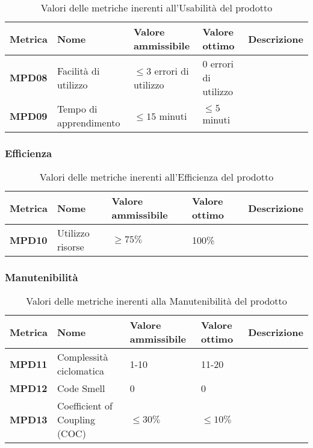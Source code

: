 \documentclass[italian,12pt]{article} %
\begin{document}
\begin{table}[h!]
	\centering
	\begin{tabularx}{\textwidth}{|X|X|X|X|X|} 	 
		\hline
		\textbf{Metrica} 	& \textbf{Nome} & \textbf{Valore ammissibile} & \textbf{Valore ottimo} & \textbf{Descrizione}\\  	 
		\hline
		\textbf{MPD08} & Facilità di utilizzo & $\leq 3 $ errori di utilizzo & 0 errori di utilizzo &\\
		\hline
		\textbf{MPD09} & Tempo di apprendimento & $\leq 15 $ minuti  & $\leq 5 $ minuti & \\ 
		\hline
	\end{tabularx}
	\caption{ Valori delle metriche inerenti all'Usabilità del prodotto}
	\label{table:9}
	\end{table}

\subsubsection{Efficienza}

\begin{table}[h!]
	\centering
	\begin{tabularx}{\textwidth}{|X|X|X|X|X|} 	 
		\hline
		\textbf{Metrica} 	& \textbf{Nome} & \textbf{Valore ammissibile} & \textbf{Valore ottimo} & \textbf{Descrizione}\\  	 
		\hline
		\textbf{MPD10} & Utilizzo risorse & $\geq 75\% $  & 100\% & \\
		\hline
	\end{tabularx}
	\caption{ Valori delle metriche inerenti all'Efficienza del prodotto}
	\label{table:10}
	\end{table}

\subsubsection{Manutenibilità}

\begin{table}[h!]
	\centering
	\begin{tabularx}{\textwidth}{|X|X|X|X|X|} 	 
		\hline
		\textbf{Metrica} 	& \textbf{Nome} & \textbf{Valore ammissibile} & \textbf{Valore ottimo} & \textbf{Descrizione}\\  	 
		\hline
		\textbf{MPD11} & Complessità ciclomatica & 1-10 & 11-20 & \\
		\hline
		\textbf{MPD12} & Code Smell & 0 & 0 & \\ 
		\hline
		\textbf{MPD13} & Coefficient of Coupling (COC) & $\leq 30\% $ & $\leq 10\% $ & \\ 
		\hline
	\end{tabularx}
	\caption{ Valori delle metriche inerenti alla Manutenibilità del prodotto}
	\label{table:11}
	\end{table}
\end{document}
